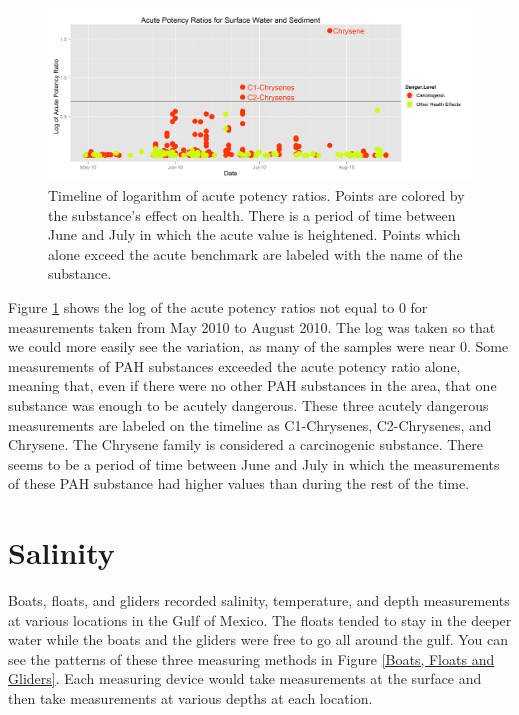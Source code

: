 \documentclass[authoryear,12pt]{elsarticle}
\begin{document}
\begin{figure}[htbp] %
   \centering
   \includegraphics[width=5in]{acute-timeline3.png} 
   \caption{Timeline of logarithm of acute potency ratios.  Points are colored by the substance's effect on health. There is a period of time between June and July in which the acute value is heightened.  Points which alone exceed the acute benchmark are labeled with the name of the substance.}
   \label{pah-timeline}
\end{figure}


Figure \ref {pah-timeline} shows the log of the acute potency ratios not equal to 0 for measurements taken from May 2010 to August 2010. The log was taken so that we could more easily see the variation, as many of the samples were near 0. Some measurements of PAH substances exceeded the acute potency ratio alone, meaning that, even if there were no other PAH substances in the area, that one substance was enough to be acutely dangerous. These three acutely dangerous measurements are labeled on the timeline as C1-Chrysenes, C2-Chrysenes, and Chrysene. The Chrysene family is considered a carcinogenic substance. There seems to be a period of time between June and July in which the measurements of these PAH substance had higher values than during the rest of the time.

\section{Salinity}
Boats, floats, and gliders recorded salinity, temperature, and depth measurements at various locations in the Gulf of Mexico. The floats tended to stay in the deeper water while the boats and the gliders were free to go all around the gulf.  You can see the patterns of these three measuring methods in Figure \ref {Boats, Floats and Gliders}. Each measuring device would take measurements at the surface and then take measurements at various depths at each location.  
\end{document}

